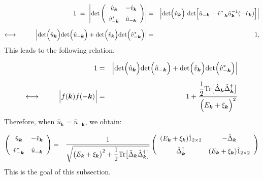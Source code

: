 \documentclass[uplatex,a4j,12pt,dvipdfmx]{jsarticle}
\begin{document}
\begin{eqnarray}
	1
	\ = \
	\left|
	{\rm det}
	\left(
	\begin{array}{cc}
			\hat{u}_{\bm{k}}       & - \hat{v}_{\bm{k}} \\[2mm]
			\hat{v}_{- \bm{k}}^{*} & \hat{u}_{-\bm{k}}
		\end{array}
	\right)
	\right|
	&=&
	\left|
	{\rm det} \Big( \hat{u}_{\bm{k}} \Big)
	\
	{\rm det} \Big[ \hat{u}_{- \bm{k}} - \hat{v}_{- \bm{k}}^{*} \hat{u}_{\bm{k}}^{-1} ( - \hat{v}_{\bm{k}} ) \Big]
	\right|
	\nonumber \\[2mm]
	\longleftrightarrow
	\hspace{10mm}
	\Big|
	{\rm det} \Big( \hat{u}_{\bm{k}} \Big) {\rm det} \Big( \hat{u}_{- \bm{k}} \Big)
	+
	{\rm det} \Big( \hat{v}_{\bm{k}} \Big) {\rm det} \Big( \hat{v}_{- \bm{k}}^{*} \Big)
	\Big|
	&=&
	1
	,
\end{eqnarray}
%
This leads to the following relation.

\begin{eqnarray}
	1
	&=&
	\Big|
	{\rm det} \Big( \hat{u}_{\bm{k}} \Big) {\rm det} \Big( \hat{u}_{- \bm{k}} \Big)
	+
	{\rm det} \Big( \hat{v}_{\bm{k}} \Big) {\rm det} \Big( \hat{v}_{- \bm{k}}^{*} \Big)
	\Big|
	\nonumber \\[2mm] \longleftrightarrow \hspace{9mm}
	\Big| f(\bm{k})f(-\bm{k}) \Big|
	&=&
	1
	+
	\dfrac{
		\dfrac{1}{2} {\rm Tr} \big[ \hat{\Delta}_{\bm{k}} \hat{\Delta}^{\dagger}_{\bm{k}} \big]
	}
	{
		\Big( E_{\bm{k}} + \xi_{\bm{k}} \Big)^{2}
	}
\end{eqnarray}
%
Therefore, when $\hat{u}_{\bm{k}} = \hat{u}_{ - \bm{k} }$, we obtain:

\begin{eqnarray}
	\left(
	\begin{array}{cc}
			\hat{u}_{\bm{k}}       & - \hat{v}_{\bm{k}} \\[2mm]
			\hat{v}_{- \bm{k}}^{*} & \hat{u}_{-\bm{k}}
		\end{array}
	\right)
	&=&
	\dfrac{ 1 }{ \sqrt{ \big( E_{\bm{k}} + \xi_{\bm{k}} \big)^{2} + \dfrac{1}{2} {\rm Tr} \big[ \hat{\Delta}_{\bm{k}} \hat{\Delta}^{\dagger}_{\bm{k}} \big] } }
	\left(
	\begin{array}{cc}
			( E_{\bm{k}} + \xi_{\bm{k}} ) \hat{1}_{2 \times 2} & - \hat{\Delta}_{\bm{k}}                            \\[2mm]
			\hat{\Delta}_{\bm{k}}^{\dagger}                    & ( E_{\bm{k}} + \xi_{\bm{k}} ) \hat{1}_{2 \times 2}
		\end{array}
	\right)
\end{eqnarray}
%
This is the goal of this subsection.
\end{document}
